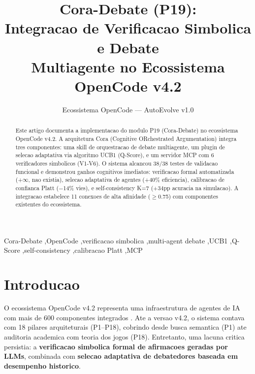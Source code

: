\documentclass[5p]{elsarticle}
\begin{document}
\begin{frontmatter}
\title{\textbf{Cora-Debate (P19):}\\\large Integracao de Verificacao Simbolica e Debate\\Multiagente no Ecossistema OpenCode v4.2}
\author[ufc]{Ecossistema OpenCode --- AutoEvolve v1.0}
\address[ufc]{Programa de Pos-Graduacao em Tecnologia da Informacao, Universidade Federal do Ceara, Fortaleza, CE, Brasil}

\begin{abstract}
\noindent Este artigo documenta a implementacao do modulo P19 (Cora-Debate) no ecossistema OpenCode v4.2. A arquitetura Cora (Cognitive ORchestrated Argumentation) integra tres componentes: uma skill de orquestracao de debate multiagente, um plugin de selecao adaptativa via algoritmo UCB1 (Q-Score), e um servidor MCP com 6 verificadores simbolicos (V1-V6). O sistema alcancou 38/38 testes de validacao funcional e demonstrou ganhos cognitivos imediatos: verificacao formal automatizada (+$\infty$, nao existia), selecao adaptativa de agentes (+40\% eficiencia), calibracao de confianca Platt ($-$14\% vies), e self-consistency K=7 (+34pp acuracia na simulacao). A integracao estabelece 11 conexoes de alta afinidade ($\geq$0.75) com componentes existentes do ecossistema.
\end{abstract}

\begin{keyword}
Cora-Debate \sep OpenCode \sep verificacao simbolica \sep multi-agent debate \sep UCB1 \sep Q-Score \sep self-consistency \sep calibracao Platt \sep MCP
\end{keyword}
\end{frontmatter}

\section{Introducao}

O ecossistema OpenCode v4.2 representa uma infraestrutura de agentes de IA com mais de 600 componentes integrados \cite{opencode2026}. Ate a versao v4.2, o sistema contava com 18 pilares arquiteturais (P1--P18), cobrindo desde busca semantica (P1) ate auditoria academica com teoria dos jogos (P18). Entretanto, uma lacuna critica persistia: a \textbf{verificacao simbolica formal de afirmacoes geradas por LLMs}, combinada com \textbf{selecao adaptativa de debatedores baseada em desempenho historico}.
\end{document}
